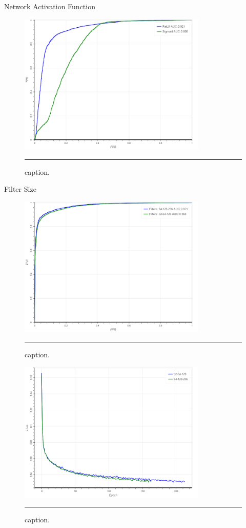   Network Activation Function
  
\begin{figure}[htbp]
  \centering
    \includegraphics[width = 0.8\textwidth]{./Figures/AUC_activations.png}
    \rule{35em}{0.5pt}
  \caption[Activations]{caption.}
  \label{fig:}
\end{figure}


  Filter Size
\begin{figure}[htbp]
  \centering
    \includegraphics[width = 0.8\textwidth]{./Figures/AUC_filters_mdl0.png}
    \rule{35em}{0.5pt}
  \caption[Filter Size Performance]{caption.}
  \label{fig:}
\end{figure}

\begin{figure}[htbp]
  \centering
    \includegraphics[width = 0.8\textwidth]{./Figures/training_filter_size_mdl0.png}
    \rule{35em}{0.5pt}
  \caption[Filter Size Training]{caption.}
  \label{fig:}
\end{figure}

